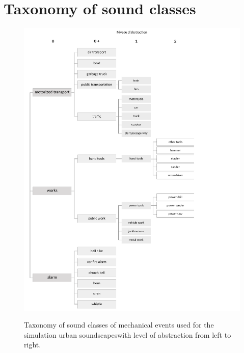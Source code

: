\documentclass[12pt]{elsarticle}
\providecommand{\DIFadd}[1]{{\protect\color{blue}\uwave{#1}}} %
\providecommand{\DIFaddbegin}{} %
\providecommand{\DIFaddend}{} %
\providecommand{\DIFdelbegin}{} %
\providecommand{\DIFdelend}{} %
\providecommand{\DIFaddFL}[1]{\DIFadd{#1}} %
\providecommand{\DIFaddbeginFL}{} %
\providecommand{\DIFaddendFL}{} %
\begin{document}

\DIFdelbegin %
\DIFdelend \DIFaddbegin 
{}
\DIFaddend 


\appendix
\newpage
\section{Taxonomy of sound classes}
\label{app:taxonomie}

\begin{figure}[!hp]
    \centering
        {\includegraphics[trim={ 0 0 0cm 1cm},clip,width=.9\columnwidth]{gfx/appendix/event_1_en}\label{fig:taxonomieEventa}} \par
         \caption{Taxonomy of sound classes of mechanical events used for the simulation \DIFaddbeginFL \DIFaddFL{of }\DIFaddendFL urban soundscapes\DIFaddbeginFL \DIFaddFL{, }\DIFaddendFL with level of abstraction from left to right.}
       \label{fig:taxonomieEa}
\end{figure}
\end{document}
